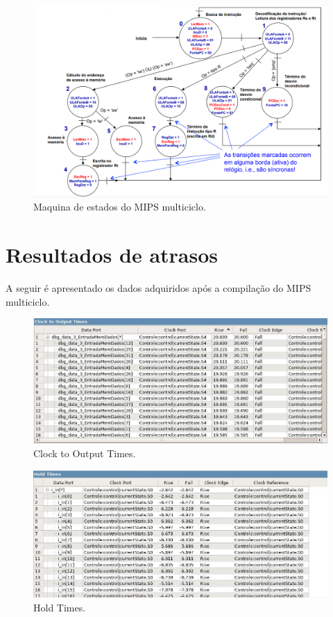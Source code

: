 \documentclass{article}
\begin{document}
        \begin{figure}[H]
            \centering
            \includegraphics[scale=1.5]{maquina_estados.png}
            \caption{Maquina de estados do MIPS multiciclo.}
            \label{figura:maquina}
        \end{figure}

        \section{Resultados de atrasos}

        A seguir é apresentado os dados adquiridos após a compilação do MIPS
        multiciclo.

        \begin{figure}[H]
            \centering
            \includegraphics[width=\textwidth]{clock_to_output_times.jpg}
            \caption{Clock to Output Times.}
            \label{figura:mips}
        \end{figure}

        \begin{figure}[H]
            \centering
            \includegraphics[width=\textwidth]{hold_times.jpg}
            \caption{Hold Times.}
            \label{figura:mips}
        \end{figure}
\end{document}
